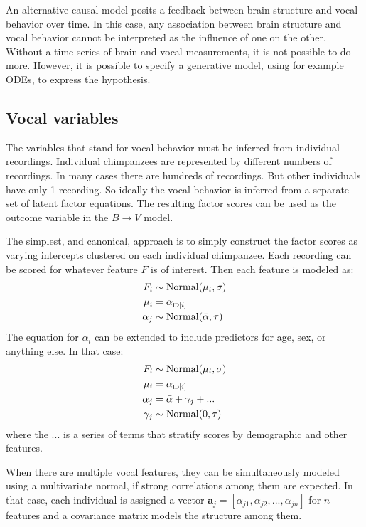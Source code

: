 \documentclass[reqno ,11pt]{amsart}
\begin{document}
An alternative causal model posits a feedback between brain structure and vocal behavior over time. In this case, any association between brain structure and vocal behavior cannot be interpreted as the influence of one on the other. Without a time series of brain and vocal measurements, it is not possible to do more. However, it is possible to specify a generative model, using for example ODEs, to express the hypothesis.

\subsection{Vocal variables}

The variables that stand for vocal behavior must be inferred from individual recordings. Individual chimpanzees are represented by different numbers of recordings. In many cases there are hundreds of recordings. But other individuals have only 1 recording. So ideally the vocal behavior is inferred from a separate set of latent factor equations. The resulting factor scores can be used as the outcome variable in the $B \rightarrow V$ model.

The simplest, and canonical, approach is to simply construct the factor scores as varying intercepts clustered on each individual chimpanzee. Each recording can be scored for whatever feature $F$ is of interest. Then each feature is modeled as:
\begin{align*}
  F_i &\sim \text{Normal}(\mu_i,\sigma)\\
  \mu_i &= \alpha_{\textsc{id}[i]}\\
  \alpha_j &\sim \text{Normal}(\bar \alpha,\tau)
\end{align*}
The equation for $\alpha_i$ can be extended to include predictors for age, sex, or anything else. In that case:
\begin{align*}
  F_i &\sim \text{Normal}(\mu_i,\sigma)\\
  \mu_i &= \alpha_{\textsc{id}[i]}\\
  \alpha_j &= \bar \alpha + \gamma_{j} + ...\\
  \gamma_j &\sim \text{Normal}(0,\tau)
\end{align*}
where the $...$ is a series of terms that stratify scores by demographic and other features.

When there are multiple vocal features, they can be simultaneously modeled using a multivariate normal, if strong correlations among them are expected. In that case, each individual is assigned a vector $\mathbf a_j = [ \alpha_{j1} , \alpha_{j2} , ... , \alpha_{jn} ]$ for $n$ features and a covariance matrix models the structure among them.
\end{document}
